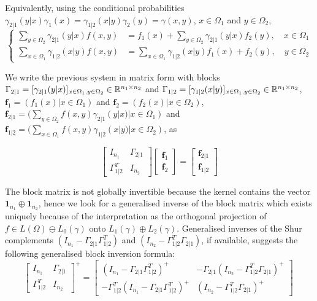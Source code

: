 \documentclass[runningheads]{llncs}
\begin{document}
Equivalently, using the conditional probabilities $\gamma_{2|1}(y|x) \gamma_1(x) = \gamma_{1|2}(x|y) \gamma_2(y) = \gamma(x,y)$, $x \in \Omega_1$ and $y \in \Omega_2$,
%
\begin{equation*}
\begin{cases}
  \sum_{y \in \Omega_2} \gamma_{2|1}(y|x)f(x,y) &= f_1(x) + \sum_{y \in \Omega_2} \gamma_{2|1}(y|x) f_2(y) , \quad x \in \Omega_1 \\
  \sum_{x \in \Omega_1} \gamma_{1|2}(x|y)f(x,y) &= \sum_{x \in \Omega_1} \gamma_{1|2}(x|y) f_1(x)  + f_2(y) , \quad y \in \Omega_2
\end{cases}
\end{equation*}
%

We write the previous system in matrix form with blocks $\Gamma_{2|1} = [\gamma_{2|1}(y|x)]_{x \in \Omega_1, y \in \Omega_2} \in \mathbb R^{n_1 \times n_2}$ and $\Gamma_{1|2} = [\gamma_{1|2}(x|y)]_{x \in \Omega_1, y \in \Omega_2} \in \mathbb R^{n_1 \times n_2}$, $\bm f_1 = (f_1(x) | x \in \Omega_1)$ and $\bm f_2 = (f_2(x) | x \in \Omega_2)$, $\bm f_{2|1} = (\sum_{y \in \Omega_2} f(x,y)\gamma_{2|1}(y|x) | x \in \Omega_1)$ and $\bm f_{1|2} = (\sum_{x\in\Omega_1} f(x,y)\gamma_{1|2}(x|y) | x \in \Omega_2)$, as 

\begin{equation}
\label{eq:block}
  \begin{bmatrix}
    I_{n_1} & \Gamma_{2|1} \\ \Gamma_{1|2}^T & I_{n_2}
  \end{bmatrix}
  \begin{bmatrix}
    \bm f_1 \\ \bm f_2
  \end{bmatrix}
=
\begin{bmatrix}
  \bm f_{2|1} \\ \bm f_{1|2}
\end{bmatrix}
\end{equation}

The block matrix is not globally invertible because the kernel contains the vector $\bm 1 _{n_1} \oplus \bm 1_{n_2}$, hence we look for a generalised inverse of the block matrix  which  exists uniquely because of the interpretation as the orthogonal projection of $f \in L(\Omega) \ominus L_0(\gamma)$ onto $L_1(\gamma)\oplus L_2(\gamma)$. Generalised inverses of the Shur complements $(I_{n_1}-\Gamma_{2|1}\Gamma_{1|2}^T)$ and $(I_{n_2}-\Gamma_{1|2}^T\Gamma_{2|1})$, if available, suggests the following generalised block inversion formula:
%
\begin{equation}
\label{eq:blocksolve}
\begin{bmatrix}
    I_{n_1} & \Gamma_{2|1} \\ \Gamma_{1|2}^T & I_{n_2}
  \end{bmatrix} ^+ =
  \begin{bmatrix}
    (I_{n_1}-\Gamma_{2|1}\Gamma_{1|2}^T)^{+} & - \Gamma_{2|1} (I_{n_2}-\Gamma_{1|2}^T\Gamma_{2|1})^{+} \\
 - \Gamma_{1|2}^T (I_{n_1}-\Gamma_{2|1}\Gamma_{1|2}^T)^{+} & (I_{n_2}-\Gamma_{1|2}^T\Gamma_{2|1})^{+} 
\end{bmatrix} \ 
\end{equation}
\end{document}
